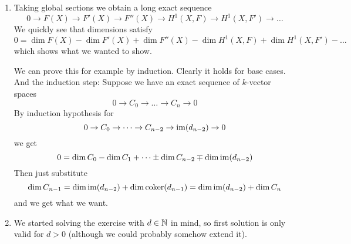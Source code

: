 \newcommand{\sheet}{10}




\maketitle{}

\begin{exercise}{3}
    \begin{enumerate}
        \item{
                Taking global sections we obtain a long exact sequence
                \begin{equation*}
                    0 \to F(X) \to F'(X) \to F''(X) \to H^1(X, F) \to H^1(X, F')
                    \to \dots
                \end{equation*}
                We quickly see that dimensions satisfy
                \begin{equation*}
                    0 = \dim F(X) - \dim F'(X) + \dim F''(X) - \dim H^1(X, F) +
                    \dim H^1(X, F') - \dots
                \end{equation*}
                which shows what we wanted to show.

                We can prove this for example by induction. Clearly it holds for
                base cases. And the induction step:
                Suppose we have an exact sequence of $k$-vector spaces
                \begin{equation*}
                    0 \to C_0 \to \dots \to C_n \to 0
                \end{equation*}
                By induction hypothesis for
                \begin{equation*}
                    0 \to C_0 \to \dots \to C_{n-2} \to \operatorname{im}(d_{n-2}) \to 0
                \end{equation*}
                we get
                \begin{equation*}
                    0 = \dim C_0 - \dim C_1 + \dots \pm \dim C_{n-2} \mp \dim
                    \operatorname{im}(d_{n-2})
                \end{equation*}
                Then just substitute
                \begin{equation*}
                    \dim C_{n-1} = \dim \operatorname{im}(d_{n-2}) + \dim \operatorname{coker}(d_{n-1})
                    = \dim \operatorname{im}(d_{n-2}) + \dim C_n
                \end{equation*}
                and we get what we want.
            }
        \item{
                We started solving the exercise with $d \in \mathbb{N}$ in mind, so
                first solution is only valid for $d > 0$ (although we could
                probably somehow extend it).

}
\end{enumerate}
\end{exercise}
